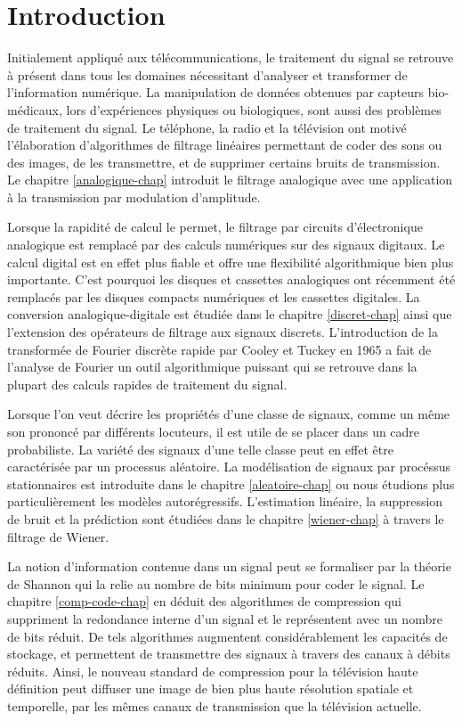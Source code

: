 \chapter{Introduction}

Initialement appliqu\'e aux t\'el\'ecommunications, le traitement
du signal se retrouve \`a pr\'esent 
dans tous les domaines n\'ecessitant d'analyser et transformer
de l'information num\'erique.
La manipulation de donn\'ees obtenues par capteurs 
bio-m\'edicaux, lors d'exp\'eriences physiques ou biologiques, 
sont aussi des probl\`emes de traitement du signal.
Le t\'el\'ephone, la radio et la t\'el\'evision ont motiv\'e l'\'elaboration
d'algorithmes de filtrage lin\'eaires permettant de coder
des sons ou des images, de les transmettre, et de supprimer 
certains bruits de transmission. 
Le chapitre \ref{analogique-chap}
introduit le filtrage analogique avec une
application \`a la transmission par
modulation d'amplitude.

Lorsque la rapidit\'e de calcul le permet,
le filtrage par circuits d'\'electronique
analogique est remplac\'e par des calculs num\'eriques
sur des signaux digitaux. Le calcul digital est en effet plus
fiable et offre une flexibilit\'e algorithmique bien plus 
importante.
C'est pourquoi les disques et 
cassettes analogiques ont r\'ecemment \'et\'e remplac\'es
par les disques compacts num\'eriques et les cassettes
digitales. La conversion analogique-digitale est \'etudi\'ee
dans le chapitre \ref{discret-chap} 
ainsi que l'extension des op\'erateurs de filtrage
aux signaux discrets. L'introduction de
la transform\'ee de Fourier discr\`ete rapide 
par Cooley et Tuckey en 1965
a fait de l'analyse de Fourier un outil algorithmique
puissant qui se retrouve dans la
plupart des calculs rapides de traitement du signal.

Lorsque l'on veut d\'ecrire les propri\'et\'es d'une classe de signaux,
comme un m\^eme son prononc\'e par diff\'erents locuteurs,
il est utile de se placer dans un cadre probabiliste.
La vari\'et\'e des signaux d'une telle classe peut en effet
\^etre caract\'eris\'ee par un processus al\'eatoire.
La mod\'elisation de signaux par proc\'essus stationnaires est
introduite dans le
chapitre \ref{aleatoire-chap} 
ou nous \'etudions plus particuli\`erement
les mod\`eles autor\'egressifs.
L'estimation lin\'eaire, la suppression de bruit
et la pr\'ediction sont \'etudi\'ees dans le chapitre 
\ref{wiener-chap} \`a travers le filtrage de Wiener. 


La notion d'information contenue dans un signal peut se formaliser
par la th\'eorie de Shannon qui la relie au nombre de bits minimum
pour coder le signal. Le chapitre \ref{comp-code-chap}
en d\'eduit des algorithmes de compression 
qui suppriment la redondance interne
d'un signal et le repr\'esentent avec un nombre de bits r\'eduit.
De tels algorithmes augmentent consid\'erablement les capacit\'es de
stockage, et permettent de transmettre
des signaux \`a travers des canaux \`a d\'ebits r\'eduits. 
Ainsi, le nouveau 
standard de compression pour la t\'el\'evision haute d\'efinition peut
diffuser une image de bien plus haute r\'esolution spatiale
et temporelle, par les m\^emes canaux de transmission 
que la t\'el\'evision actuelle.

